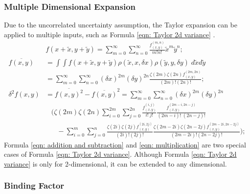 \documentclass[twoside]{article}
\numberwithin{equation}{section}
\newcommand{\eqspace}{\;\;\;}
\begin{document}
\subsubsection{Multiple Dimensional Expansion}

Due to the uncorrelated uncertainty assumption, the Taylor expansion can be applied to multiple inputs, such as Formula \eqref{eqn: Taylor 2d variance} \cite{Prev_Precision_Arithmetic} .
\begin{align}
\label{eqn: Taylor 2d}
&f(x + \tilde{x}, y + \tilde{y}) = \sum_{m=0}^{\infty} \sum_{n=0}^{\infty} \frac{f^{(m,n)}_{(x,y)}}{m! n!} \tilde{x}^m \tilde{y}^n; \\
\label{eqn: Taylor 2d mean}
\overline{f(x,y)} &= \int \int f(x + \tilde{x}, y + \tilde{y}) \rho(\tilde{x}, x, \delta x) \rho(\tilde{y}, y, \delta y)\; d \tilde{x} d \tilde{y} \\
&= \sum_{m=0}^{\infty} \sum_{n=0}^{\infty} (\delta x)^{2m} (\delta y)^{2n}  \frac{\zeta(2m) \zeta(2n) f^{(2m,2n)}_{(x,y)}}{(2m)! (2n)!}; \nonumber \\
\label{eqn: Taylor 2d variance}
\delta^2 f(x, y) &= \overline{f(x, y)^2} - \overline{f(x, y)}^2 = \sum_{m=0}^{\infty} \sum_{n=0}^{\infty} (\delta x)^{2m} (\delta y)^{2n} \\
&\eqspace (\zeta(2m) \zeta(2n) \sum_{i=0}^{2m} \sum_{j=0}^{2n} \frac{f^{(i,j)}_{(x,y)}}{i!\;j!}\frac{f^{(2m-i,2n-j)}_{(x,y)}}{(2m-i)!\;(2n-j)!} \nonumber \\
&\eqspace\eqspace - \sum_{i=0}^{m} \sum_{j=0}^{n} \frac{\zeta(2i) \zeta(2j) f^{(2i,2j)}_{(x,y)}}{(2i)!(2j)!}
	\frac{\zeta(2m-2i) \zeta(2n-2j) f^{(2m-2i,2n-2j)}_{(x,y)}}{(2m-2i)!(2n-2j)!}); \nonumber
\end{align}
Formula \eqref{eqn: addition and subtraction} and \eqref{eqn: multiplication} are two special cases of Formula \eqref{eqn: Taylor 2d variance}.
Although Formula \eqref{eqn: Taylor 2d variance} is only for 2-dimensional, it can be extended to any dimensional.



\subsubsection{Binding Factor}
\end{document}

